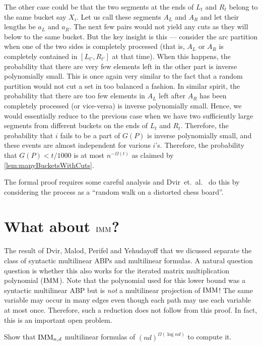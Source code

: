 The other case could be that the two segments at the ends of $L_t$ and $R_t$ belong to the same bucket say $X_i$.
Let us call these segments $A_L$ and $A_R$ and let their lengths be $a_L$ and $a_R$.
The next few pairs would not yield any cuts as they will below to the same bucket.
But the key insight is this --- consider the arc partition when one of the two sides is completely processed (that is, $A_L$ or $A_R$ is completely contained in $[L_{t'},R_{t'}]$ at that time).
When this happens, the probability that there are very few elements left in the other part is inverse polynomially small.
This is once again very similar to the fact that a random partition would not cut a set in too balanced a fashion.
In similar spirit, the probability that there are too few elements in $A_L$ left after $A_R$ has been completely processed (or vice-versa) is inverse polynomially small.
Hence, we would essentially reduce to the previous case when we have two sufficiently large segments from different buckets on the ends of $L_t$ and $R_t$.
Therefore, the probability that $i$ fails to be a part of $G(P)$ is inverse polynomially small, and these events are almost independent for various $i$'s.
Therefore, the probability that $G(P) < t/1000$ is at most $n^{-\Omega(t)}$ as claimed by \autoref{lem:manyBucketsWithCuts}.


The formal proof requires some careful analysis and Dvir~et.~al.~\cite{dmpy12} do this by considering the process as a ``random walk on a distorted chess board''. 

\section{What about $\operatorname{\mathrm{IMM}}$?}

The result of Dvir, Malod, Perifel and Yehudayoff \cite{dmpy12} that we dicussed separate the class of syntactic multilinear ABPs and multilinear formulas.
A natural question question is whether this also works for the iterated matrix multiplication polynomial ($\operatorname{\mathrm{IMM}}$).
Note that the polynomial used for this lower bound was a syntactic multilinear ABP but is \emph{not} a multilinear projection of $\operatorname{\mathrm{IMM}}$!
The same variable may occur in many edges even though each path may use each variable at most once.
Therefore, such a reduction does not follow from this proof.
In fact, this is an important open problem.

\begin{openproblem}
  Show that $\operatorname{\mathrm{IMM}}_{n,d}$ multilinear formulas of $(nd)^{\Omega(\log nd)}$ to compute it. 
\end{openproblem}


